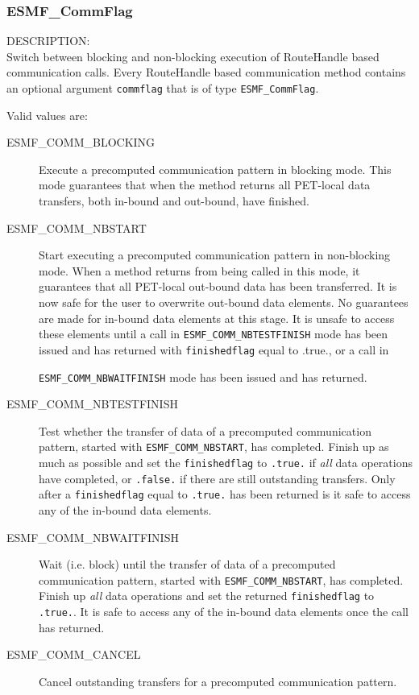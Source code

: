 \subsubsection{ESMF\_CommFlag}
\label{opt:commflag}
{\sf DESCRIPTION:\\}  
Switch between blocking and non-blocking execution of RouteHandle based
communication calls. Every RouteHandle based communication method contains
an optional argument {\tt commflag} that is of type {\tt ESMF\_CommFlag}.

Valid values are:
\begin{description}

\item [ESMF\_COMM\_BLOCKING]
         Execute a precomputed communication pattern in blocking mode. This
         mode guarantees that when the method returns all PET-local data
         transfers, both in-bound and out-bound, have finished. 
\item [ESMF\_COMM\_NBSTART]
         Start executing a precomputed communication pattern in non-blocking
         mode. When a method returns from being called in this mode, it
         guarantees that all PET-local out-bound data has been transferred.
         It is now safe for the user to overwrite out-bound data elements.
         No guarantees are made for in-bound data elements at this stage. It is
         unsafe to access these elements until a call in
         {\tt ESMF\_COMM\_NBTESTFINISH} mode has been issued and has returned
         with {\tt finishedflag} equal to .true., or a call in

         {\tt ESMF\_COMM\_NBWAITFINISH} mode has been issued and has returned.
\item [ESMF\_COMM\_NBTESTFINISH]
         Test whether the transfer of data of a precomputed communication
         pattern, started with {\tt ESMF\_COMM\_NBSTART}, has completed.
         Finish up as much as possible and set the {\tt finishedflag} to 
         {\tt .true.} if {\em all} data operations have completed, or
         {\tt .false.} if there are still outstanding transfers. Only after
         a {\tt finishedflag} equal to {\tt .true.} has been returned is it
         safe to access any of the in-bound data elements.
\item [ESMF\_COMM\_NBWAITFINISH]
         Wait (i.e. block) until the transfer of data of a precomputed
         communication pattern, started with {\tt ESMF\_COMM\_NBSTART}, has
         completed. Finish up {\em all} data operations and set the returned 
         {\tt finishedflag} to {\tt .true.}. It is safe to access any of the
         in-bound data elements once the call has returned.
\item [ESMF\_COMM\_CANCEL]
         Cancel outstanding transfers for a precomputed communication pattern.
\end{description}

